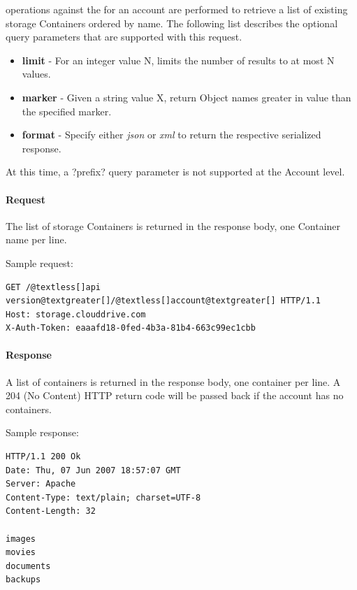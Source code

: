 \documentclass[letterpaper,10pt,english]{manual}
\begin{document}
 operations against the  for an account are
performed to retrieve a list of existing storage Containers ordered by
name.  The following list describes the optional query parameters that
are supported with this request.
\begin{itemize}
\item {} 
\textbf{limit} - For an integer value N, limits the number of results to
at most N values.

\item {} 
\textbf{marker} - Given a string value X, return Object names greater in
value than the specified marker.

\item {} 
\textbf{format} - Specify either \emph{json} or \emph{xml} to return the respective
serialized response.

\end{itemize}

At this time, a ?prefix? query parameter is not supported at the Account
level.


\paragraph{Request}

The list of storage Containers is returned in the response body, one
Container name per line.

Sample request:

\begin{Verbatim}[commandchars=@\[\]]
GET /@textless[]api version@textgreater[]/@textless[]account@textgreater[] HTTP/1.1
Host: storage.clouddrive.com
X-Auth-Token: eaaafd18-0fed-4b3a-81b4-663c99ec1cbb
\end{Verbatim}


\paragraph{Response}

A list of containers is returned in the response body, one container per
line. A 204 (No Content) HTTP return code will be passed back if the
account has no containers.

Sample response:

\begin{Verbatim}[commandchars=@\[\]]
HTTP/1.1 200 Ok
Date: Thu, 07 Jun 2007 18:57:07 GMT
Server: Apache
Content-Type: text/plain; charset=UTF-8
Content-Length: 32

images
movies
documents
backups
\end{Verbatim}
\end{document}
